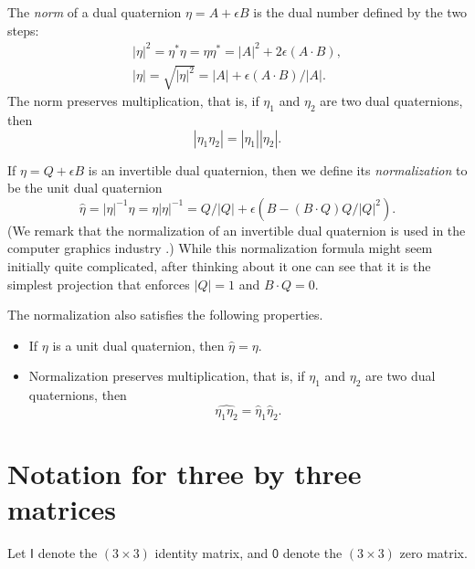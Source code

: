 \documentclass[reqno,12pt]{amsart}
\begin{document}
The \emph{norm} of a dual quaternion $\eta = A + \epsilon B$ is the dual number defined by the two steps:
\begin{gather}
|\eta|^2 = \eta^* \eta = \eta \eta^* = |A|^2 + 2 \epsilon (A \cdot B) ,\\
\label{norm}
|\eta| = \sqrt{|\eta|^2} = |A| + \epsilon (A \cdot B) / |A| .
\end{gather}
The norm preserves multiplication, that is, if $\eta_1$ and $\eta_2$ are two dual quaternions, then
\begin{equation}
|\eta_1 \eta_2| = |\eta_1| |\eta_2| .
\end{equation}

If $\eta = Q + \epsilon B$ is an invertible dual quaternion, then we define its \emph{normalization} to be the unit dual quaternion
\begin{equation}
\label{normalize}
\widehat \eta = |\eta|^{-1}\eta = \eta|\eta|^{-1}
= Q/|Q| + \epsilon (B - (B\cdot Q) Q/|Q|^2) .
\end{equation}
(We remark that the normalization of an invertible dual quaternion is used in the computer graphics industry \cite{kavan-et-al, kavan-et-al-2}.)  While this normalization formula might seem initially quite complicated, after thinking about it one can see that it is the simplest projection that enforces $|Q| = 1$ and $B\cdot Q = 0$.

The normalization also satisfies the following properties.
\begin{itemize}
\item If $\eta$ is a unit dual quaternion, then $\widehat\eta = \eta$.
\item Normalization preserves multiplication, that is, if $\eta_1$ and $\eta_2$ are two dual quaternions, then
\begin{equation}
\widehat{\eta_1 \eta_2} = \widehat \eta_1 \widehat \eta_2 .
\end{equation}
\end{itemize}

\section{Notation for three by three matrices}
\label{sec matrix notation}

Let $\mathsf I$ denote the $(3 \times 3)$ identity matrix, and $\mathsf 0$ denote the $(3 \times 3)$ zero matrix.
\end{document}
